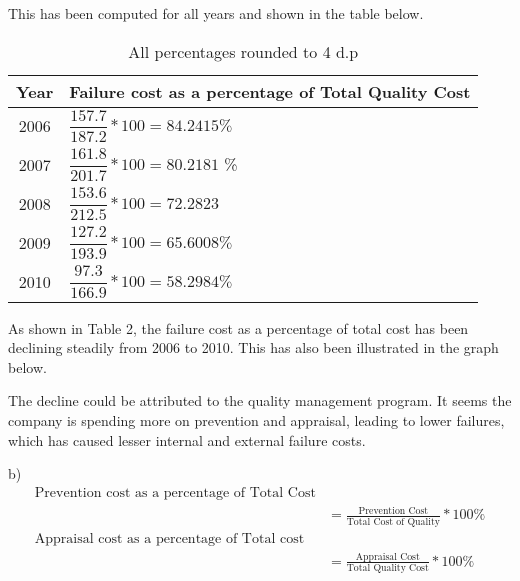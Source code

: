 \documentclass[12pt]{article}
\renewcommand{\arraystretch}{1.2}
\begin{document}
This has been computed for all years and shown in the table below.\\

\renewcommand{\arraystretch}{2.5}

	\begin{table}[h]
		\begin{center}
		\begin{tabular}{c|p{4in}}
			\hline
			Year & Failure cost as a percentage of Total Quality Cost  \\ \hline
			2006 & $\dfrac{157.7}{187.2} * 100 = 84.2415\% $  \\ \hline 
			2007 & $\dfrac{161.8}{201.7} * 100 = 80.2181$ \% \\ \hline
			2008 & $\dfrac{153.6}{212.5} * 100 = 72.2823$  \\ \hline
			2009 & $\dfrac{127.2}{193.9} * 100 = 65.6008\%$  \\ \hline
			2010 & $\dfrac{97.3}{166.9} * 100 = 58.2984\% $  \\ \hline
		\end{tabular}
		\caption{All percentages rounded to 4 d.p}
	\end{center}
	\end{table}


As shown in Table 2, the failure cost as a percentage of total cost has been declining steadily from 2006 to 2010. This has also been illustrated in the graph below.

\begin{center}
\end{center}

The decline could be attributed to the quality management program. It seems the company is spending more on prevention and appraisal, leading to lower failures, which has caused lesser internal and external failure costs.

\vspace{0.5cm}

b) 	\begin{align*}
			\text{Prevention cost as a percentage of Total Cost}\\ 
			&= \frac{\text{Prevention Cost}}{\text{Total Cost of Quality}} * 100\%\\
			\text{Appraisal cost as a percentage of Total cost}\\
			&= \frac{\text{Appraisal Cost}}{\text{Total Quality Cost}} * 100\%
	\end{align*}
\end{document}
